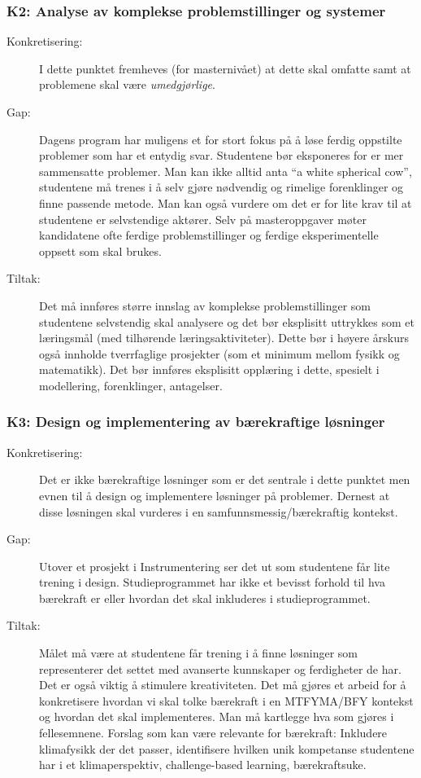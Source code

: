 \subsubsection{K2: Analyse av komplekse problemstillinger og systemer}
\begin{description}
\item[Konkretisering:] I dette punktet fremheves (for masternivået) at dette skal omfatte  samt at problemene skal være \emph{umedgjørlige}. 
\item[Gap:] Dagens program har muligens et for stort fokus på å løse ferdig oppstilte problemer som har et entydig svar. Studentene bør eksponeres for er mer sammensatte problemer. Man kan ikke alltid anta \enquote{a white spherical cow}, studentene må trenes i å selv gjøre nødvendig og rimelige forenklinger og finne passende metode. Man kan også vurdere om det er for lite krav til at studentene er selvstendige aktører. Selv på masteroppgaver møter kandidatene ofte ferdige problemstillinger og ferdige eksperimentelle oppsett som skal brukes.
\item[Tiltak:] Det må innføres større innslag av komplekse problemstillinger som studentene selvstendig skal analysere og det bør eksplisitt uttrykkes som et læringsmål (med tilhørende læringsaktiviteter). Dette bør i høyere årskurs også innholde tverrfaglige prosjekter (som et minimum mellom fysikk og matematikk). Det bør innføres eksplisitt opplæring i dette, spesielt i modellering, forenklinger, antagelser.
\end{description}

\subsubsection{K3: Design og implementering av bærekraftige løsninger}
\begin{description}
\item[Konkretisering:]Det er ikke bærekraftige løsninger som er det sentrale i dette punktet men evnen til å design og implementere løsninger på problemer. Dernest at disse løsningen skal vurderes i en samfunnsmessig/bærekraftig kontekst. 
\item[Gap:]Utover et prosjekt i Instrumentering ser det ut som studentene får lite trening i design. Studieprogrammet har ikke et bevisst forhold til hva bærekraft er eller hvordan det skal inkluderes i studieprogrammet.
\item[Tiltak:]Målet må være at studentene får trening i å finne løsninger som representerer det settet med avanserte kunnskaper og ferdigheter de har. Det er også viktig å stimulere kreativiteten. Det må gjøres et arbeid for å konkretisere hvordan vi skal tolke bærekraft i en MTFYMA/BFY kontekst og hvordan det skal implementeres. Man må kartlegge hva som gjøres i fellesemnene. Forslag som kan være relevante for bærekraft: Inkludere klimafysikk der det passer, identifisere hvilken unik kompetanse studentene har i et klimaperspektiv, challenge-based learning, bærekraftsuke.
\end{description}

